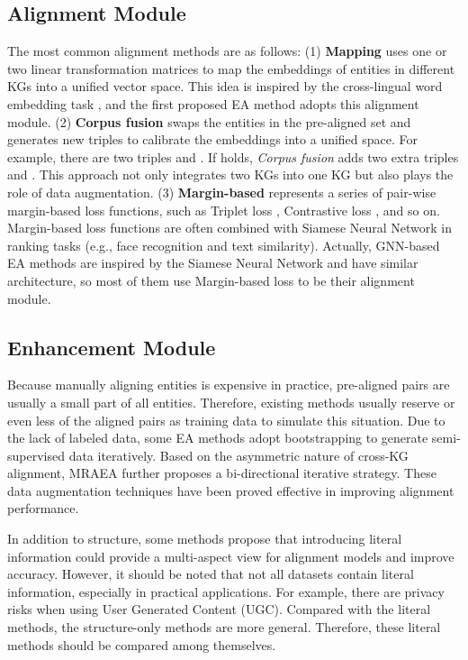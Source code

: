 \documentclass[sigconf]{acmart}
\begin{document}
\subsection{Alignment Module}
The most common alignment methods are as follows:
(1) \textbf{Mapping} \cite{DBLP:conf/ijcai/ChenTYZ17} uses one or two linear transformation matrices to map the embeddings of entities in different KGs into a unified vector space.
This idea is inspired by the cross-lingual word embedding task \cite{DBLP:conf/iclr/LampleCRDJ18}, and the first proposed EA method \cite{DBLP:conf/ijcai/ChenTYZ17} adopts this alignment module.
(2) \textbf{Corpus fusion} \cite{DBLP:conf/ijcai/SunHZQ18} swaps the entities in the pre-aligned set and generates new triples to calibrate the embeddings into a unified space.
For example, there are two triples  and .
If  holds, \emph{Corpus fusion} adds two extra triples  and .
This approach not only integrates two KGs into one KG but also plays the role of data augmentation.
(3) \textbf{Margin-based} represents a series of pair-wise margin-based loss functions, such as Triplet loss \cite{DBLP:conf/cvpr/SchroffKP15}, Contrastive loss \cite{DBLP:conf/cvpr/HadsellCL06}, and so on.
Margin-based loss functions are often combined with Siamese Neural Network in ranking tasks (e.g., face recognition and text similarity).
Actually, GNN-based EA methods are inspired by the Siamese Neural Network and have similar architecture, so most of them use Margin-based loss to be their alignment module.

\subsection{Enhancement Module}
Because manually aligning entities is expensive in practice, pre-aligned pairs are usually a small part of all entities.
Therefore, existing methods usually reserve  or even less of the aligned pairs as training data to simulate this situation.
Due to the lack of labeled data, some EA methods \cite{DBLP:conf/ijcai/SunHZQ18, DBLP:journals/corr/abs-2004-13579} adopt bootstrapping to generate semi-supervised data iteratively.
Based on the asymmetric nature of cross-KG alignment, MRAEA \cite{DBLP:conf/wsdm/MaoWXLW20} further proposes a bi-directional iterative strategy.
These data augmentation techniques have been proved effective in improving alignment performance.

In addition to structure, some methods \cite{DBLP:conf/emnlp/WuLFWZ19,DBLP:conf/emnlp/YangZSLLS19} propose that introducing literal information could provide a multi-aspect view for alignment models and improve accuracy.
However, it should be noted that not all datasets contain literal information, especially in practical applications.
For example, there are privacy risks when using User Generated Content (UGC).
Compared with the literal methods, the structure-only methods are more general.
Therefore, these literal methods should be compared among themselves.
\end{document}
